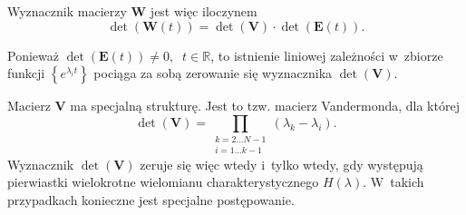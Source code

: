 \documentclass[paper=a4,DIV=12]{lpas}
\begin{document}
Wyznacznik macierzy $\mathbf{W}$ jest więc iloczynem
\begin{equation}
  \det{\left(\mathbf{W}(t)\right)} = \det{\left(\mathbf{V}\right)} \cdot \det{\left(\mathbf{E}(t)\right)}.
  \label{eq:SHE6K}
\end{equation}

Ponieważ $\det{\left(\mathbf{E}(t)\right)} \neq 0, \;\; t \in \mathbb{R}$,
to istnienie liniowej zależności w~zbiorze funkcji
$\left\lbrace e^{\lambda_i t} \right\rbrace$
pociąga za sobą zerowanie się wyznacznika $\det{\left(\mathbf{V}\right)}$.

Macierz $\mathbf{V}$ ma specjalną strukturę. Jest to tzw. macierz Vandermonda,
dla której
\begin{equation}
  \det{\left(\mathbf{V}\right)} = \prod_{
    \substack{k = 2 \dots N-1 \\ i = 1 \dots k-1}
  }{\left(\lambda_k - \lambda_i\right)}.
  \label{eq:KOD8D}
\end{equation}
Wyznacznik $\det{\left(\mathbf{V}\right)}$ zeruje się więc wtedy i~tylko
wtedy, gdy występują pierwiastki wielokrotne wielomianu charakterystycznego
$H(\lambda)$. W~takich przypadkach konieczne jest specjalne postępowanie.
\end{document}
